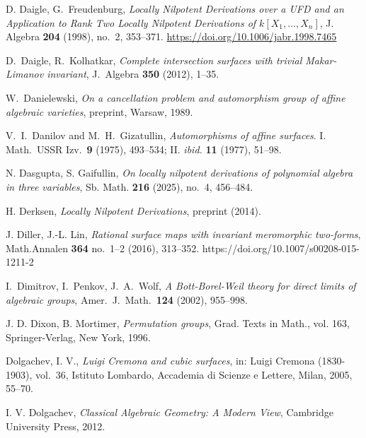D. Daigle, G.~Freudenburg, \emph{Locally Nilpotent Derivations over a UFD and an Application to Rank Two Locally Nilpotent Derivations of $k[X_1,\ldots,X_n]$}, J. Algebra \textbf{204} (1998), no.~2, 353--371. \url{https://doi.org/10.1006/jabr.1998.7465}

D.~Daigle, R.~Kolhatkar, \emph{Complete intersection surfaces with trivial Makar-Limanov invariant}, J.\ Algebra \textbf{350} (2012), 1--35.

W.~Danielewski, \emph{On a cancellation problem and automorphism group of affine algebraic varieties}, preprint, Warsaw, 1989.


V.~I.~Danilov and M.~H.~Gizatullin,
\emph{Automorphisms of affine
surfaces}.
I. Math.\ USSR Izv.\ \textbf{9} (1975), 493--534; II. \emph{ibid.} \textbf{11} (1977), 51--98.

N. Dasgupta, S. Gaifullin, \emph{On locally nilpotent derivations of polynomial algebra in three variables}, Sb. Math. \textbf{216} (2025), no.~4, 456--484.

H. Derksen, \emph{Locally Nilpotent Derivations}, preprint (2014).


J. Diller, J.-L. Lin, \emph{Rational surface maps with invariant meromorphic two-forms}, Math.Annalen \textbf{364} no.~1--2 (2016), 313--352. https://doi.org/10.1007/s00208-015-1211-2

I.~Dimitrov, I.~Penkov, J.~A.~Wolf, \emph{A Bott-Borel-Weil theory for direct limits of algebraic groups}, Amer.\ J.\ Math.\ \textbf{124} (2002), 955--998.

J. D. Dixon, B. Mortimer, \emph{Permutation groups}, Grad. Texts in Math., vol. 163, Springer-Verlag, New York, 1996.

Dolgachev, I. V., \emph{Luigi {C}remona and cubic surfaces}, in: Luigi Cremona (1830-1903), vol.~36, Istituto Lombardo, Accademia di Scienze e Lettere, Milan, 2005, 55--70.

I. V. Dolgachev, \emph{Classical Algebraic Geometry: A Modern View}, Cambridge University Press, 2012.

